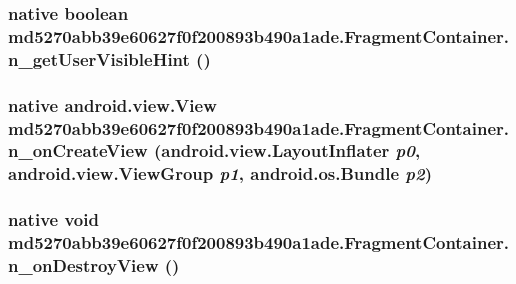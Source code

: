 \hypertarget{classmd5270abb39e60627f0f200893b490a1ade_1_1_fragment_container_7b29e98e286b30e0311c4875185dc88f}{
\subsubsection[{n\_\-getUserVisibleHint}]{\setlength{\rightskip}{0pt plus 5cm}native boolean md5270abb39e60627f0f200893b490a1ade.FragmentContainer.n\_\-getUserVisibleHint ()}}
\label{classmd5270abb39e60627f0f200893b490a1ade_1_1_fragment_container_7b29e98e286b30e0311c4875185dc88f}


\hypertarget{classmd5270abb39e60627f0f200893b490a1ade_1_1_fragment_container_4fb332bbe46a024be3eeba66bee4b879}{
\subsubsection[{n\_\-onCreateView}]{\setlength{\rightskip}{0pt plus 5cm}native android.view.View md5270abb39e60627f0f200893b490a1ade.FragmentContainer.n\_\-onCreateView (android.view.LayoutInflater {\em p0}, \/  android.view.ViewGroup {\em p1}, \/  android.os.Bundle {\em p2})}}
\label{classmd5270abb39e60627f0f200893b490a1ade_1_1_fragment_container_4fb332bbe46a024be3eeba66bee4b879}


\hypertarget{classmd5270abb39e60627f0f200893b490a1ade_1_1_fragment_container_dfb39eed167df4be40a54a70748757f4}{
\subsubsection[{n\_\-onDestroyView}]{\setlength{\rightskip}{0pt plus 5cm}native void md5270abb39e60627f0f200893b490a1ade.FragmentContainer.n\_\-onDestroyView ()}}
\label{classmd5270abb39e60627f0f200893b490a1ade_1_1_fragment_container_dfb39eed167df4be40a54a70748757f4}


